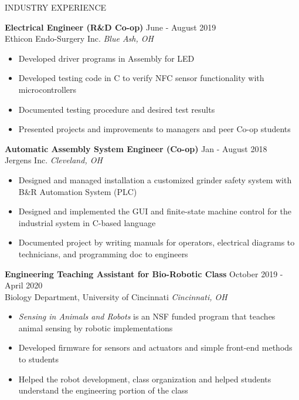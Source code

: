 \documentclass{../lib/resume} %
\begin{document}
    \begin{rSection}{INDUSTRY EXPERIENCE}

        \textbf{Electrical Engineer (R\&D Co-op)} \hfill June - August 2019\\
        Ethicon Endo-Surgery Inc. \hfill \textit{Blue Ash, OH}
        \begin{itemize}
            \itemsep -4pt {}
            \item Developed driver programs in Assembly for LED
            \item Developed testing code in C to verify NFC sensor functionality with microcontrollers
            \item Documented testing procedure and desired test results
            \item Presented projects and improvements to managers and peer Co-op students
        \end{itemize}

        \textbf{Automatic Assembly System Engineer (Co-op)} \hfill Jan - August 2018
        \\	Jergens Inc. \hfill \textit{Cleveland, OH}
        \begin{itemize}
            \itemsep -4pt {}
            \item Designed and managed installation a customized grinder safety system with B\&R Automation System (PLC)
            \item Designed and implemented the GUI and finite-state machine control for the industrial system in C-based language
            \item Documented project by writing manuals for operators, electrical diagrams to technicians, and programming doc to engineers
        \end{itemize}


        \textbf{Engineering Teaching Assistant for Bio-Robotic Class} \hfill October 2019 - April 2020\\
        Biology Department, University of Cincinnati \hfill \textit{Cincinnati, OH}
        \begin{itemize}
            \itemsep -4pt {}
            \item \textit{Sensing in Animals and Robots} is an NSF funded program that teaches animal sensing by robotic implementations
            \item Developed firmware for sensors and actuators and simple front-end methods to students
            \item Helped the robot development, class organization and helped students understand the engineering portion of the class

        \end{itemize}
    \end{rSection}
\end{document}
